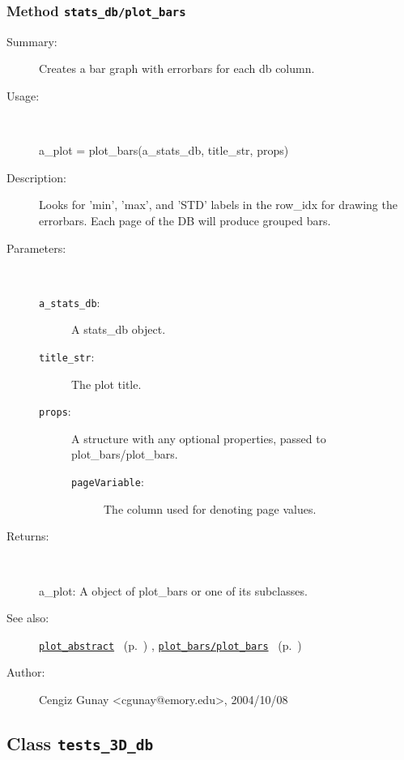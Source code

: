\subsubsection[Method \texttt{plot\_bars}]{Method \texttt{stats\_db/plot\_bars}}%
%
\label{ref_stats_db__plot_bars}%
\hypertarget{ref_stats_db__plot_bars}{}%
\begin{description}
\item[Summary:]Creates a bar graph with errorbars for each db column. 
%
\item[Usage:]~%
\begin{lyxcode}%
a\_plot = plot\_bars(a\_stats\_db, title\_str, props)
%
\end{lyxcode}%
%
\item[Description:]%
Looks for 'min', 'max', and 'STD' labels in the row\_idx for drawing the errorbars. 
 Each page of the DB will produce grouped bars.
\item[Parameters:]~
\begin{description}%
\item[\texttt{a\_stats\_db}:]
 A stats\_db object.
\item[\texttt{title\_str}:]
 The plot title.
\item[\texttt{props}:]
 A structure with any optional properties, passed to plot\_bars/plot\_bars.
\begin{description}%
\item[\texttt{pageVariable}:]
 The column used for denoting page values.
\end{description}%
\end{description}%
%
\item[Returns:]~

	a\_plot: A object of plot\_bars or one of its subclasses.
%
%
\item[See also:]%
\hyperlink{ref_plot_abstract}{\texttt{plot\_abstract}}%
\ (p.~\pageref{ref_plot_abstract})%
%
, \hyperlink{ref_plot_bars__plot_bars}{\texttt{plot\_bars/plot\_bars}}%
\ (p.~\pageref{ref_plot_bars__plot_bars})%
%
%
\item[Author:]%
Cengiz Gunay <cgunay@emory.edu>, 2004/10/08%
\end{description}
\methodline%
\subsection{Class \texttt{tests\_3D\_db}}%
%
\label{ref_tests_3D_db}%
\hypertarget{ref_tests_3D_db}{}%
